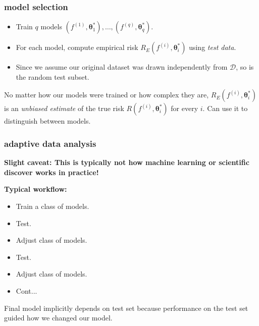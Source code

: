 \documentclass[handout,compress]{beamer}
\newcommand{\bs}[1]{\boldsymbol{#1}}
\begin{document}
\begin{frame}
	\frametitle{model selection}
	\begin{itemize}
		\item Train $q$ models $(f^{(1)}, \bs{\theta}_1^*), \ldots, (f^{(q)}, \bs{\theta}_q^*)$.
		\item For each model, compute empirical risk $R_E(f^{(i)}, \bs{\theta}_i^*)$ using \emph{test data}. 
		\item Since we assume our original dataset was drawn independently from $\mathcal{D}$, so is the random test subset.
	\end{itemize}

\begin{center}
	No matter how our models were trained or how complex they are, $R_E(f^{(i)}, \bs{\theta}_i^*)$ is an \emph{unbiased estimate} of the true risk $R(f^{(i)}, \bs{\theta}_i^*)$ for every $i$. Can use it to distinguish between models.
\end{center}
\end{frame}

\begin{frame}
	\frametitle{adaptive data analysis}
	\begin{center}
		\textbf{Slight caveat: \alert{This is typically not how machine learning or scientific discover works in practice!}}
	\end{center}
	
	\textbf{Typical workflow:}
	\begin{itemize}
		\item Train a class of models.
		\item Test.
		\item Adjust class of models.
		\item Test. 
		\item Adjust class of models.
		\item Cont...
	\end{itemize}
	Final model implicitly depends on test set because performance on the test set guided how we changed our model. 
\end{frame}
\end{document}
